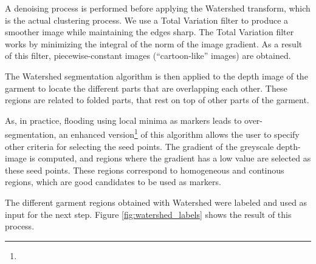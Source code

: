 
A denoising process is performed before applying the Watershed transform, which is the actual clustering process. We use a Total Variation filter  to produce a smoother image while maintaining the edges sharp. The Total Variation filter works by minimizing the integral of the norm of the image gradient. As a result of this filter, piecewise-constant images (``cartoon-like'' images) are obtained.

The Watershed segmentation algorithm is then applied to the depth image of the garment to locate the different parts that are overlapping each other. These regions are related to folded parts, that rest on top of other parts of the garment. 

As, in practice, flooding using local minima as markers  leads to over-segmentation, an enhanced version\footnote{} of this algorithm  allows the user to specify other criteria for selecting the seed points. The gradient of the greyscale depth-image is computed, and regions where the gradient has a low value are selected as these seed points. These regions correspond to homogeneous and continous regions, which are good candidates to be used as markers.


The different garment regions obtained with Watershed were labeled and used as input for the next step. Figure \ref{fig:watershed_labels} shows the result of this process.


